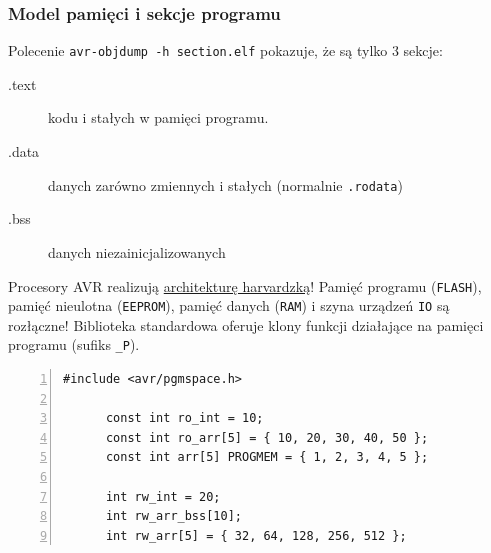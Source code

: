 \documentclass[8pt]{beamer}
\begin{document}
\begin{frame}[fragile]
  \frametitle{Model pamięci i sekcje programu}
  Polecenie \verb#avr-objdump -h section.elf# pokazuje, że są tylko 3 sekcje:
  \begin{description}
    \item[.text] kodu i stałych w pamięci programu.
    \item[.data] danych zarówno zmiennych i stałych (normalnie \texttt{.rodata})
    \item[.bss] danych niezainicjalizowanych
  \end{description}

  \begin{alertblock}{}
    Procesory AVR realizują \href{http://en.wikipedia.org/wiki/Harvard_architecture}{architekturę harvardzką}!
    Pamięć programu (\texttt{FLASH}), pamięć nieulotna (\texttt{EEPROM}),
    pamięć danych (\texttt{RAM}) i szyna urządzeń \texttt{IO} są rozłączne!
    Biblioteka standardowa oferuje klony funkcji działające na pamięci programu
    (sufiks \verb#_P#).
  \end{alertblock}

  \begin{exampleblock}{}
    \begin{lstlisting}[numbers=left]
      #include <avr/pgmspace.h>

      const int ro_int = 10;
      const int ro_arr[5] = { 10, 20, 30, 40, 50 };
      const int arr[5] PROGMEM = { 1, 2, 3, 4, 5 };

      int rw_int = 20;
      int rw_arr_bss[10];
      int rw_arr[5] = { 32, 64, 128, 256, 512 };
    \end{lstlisting}
  \end{exampleblock}
\end{frame}
\end{document}
